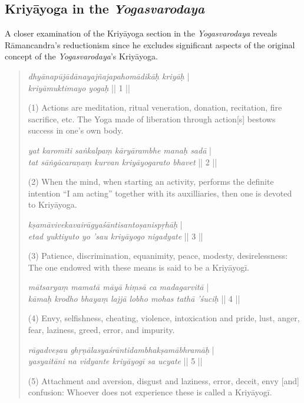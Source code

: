 \subsection{Kriyāyoga in the \textit{Yogasvarodaya}}
A closer examination of the Kriyāyoga section in the \textit{Yogasvarodaya} reveals Rāmancandra's reductionism since he excludes significant aspects of the original concept of the \textit{Yogasvarodaya}'s Kriyāyoga.


\begin{quote}
  \begin{ekdosis}
\textit{dhyānapūjādānayajñajapahomādikāḥ kriyāḥ} |\\
\textit{kriyāmuktimayo yogaḥ} || 1 ||

(1) Actions are meditation, ritual veneration, donation, recitation, fire sacrifice, etc. 
The Yoga made of liberation through action[s] bestows success in one's own body. 

\textit{yat karomīti saṅkalpaṃ kāryārambhe manaḥ sadā} |\\
\textit{tat sāṅgācaraṇaṃ kurvan kriyāyogarato bhavet} || 2 ||

(2) When the mind, when starting an activity, performs the definite intention ``I am acting''
together with its auxilliaries, then one is devoted to Kriyāyoga. 

\textit{kṣamāvivekavairāgyaśāntisantoṣanispṛhāḥ} |\\
\textit{etad yuktiyuto yo 'sau kriyāyogo nigadyate} || 3 ||

(3) Patience, discrimination, equanimity, peace, modesty, desirelessness:
The one endowed with these means is said to be a Kriyāyogī.

\textit{mātsaryaṃ mamatā māyā hiṃsā ca madagarvitā} |\\
\textit{kāmaḥ krodho bhayaṃ lajjā lobho mohas tathā 'śuciḥ} || 4 ||

(4) Envy, selfishness, cheating, violence, intoxication and pride,
lust, anger, fear, laziness, greed, error, and impurity.

\textit{rāgadveṣau ghṛṇālasyaśrāntidambhakṣamābhramāḥ} |\\
\textit{yasyaitāni na vidyante kriyāyogī sa ucyate} || 5 ||

(5) Attachment and aversion, disgust and laziness, error, deceit, envy [and] confusion:
Whoever does not experience these is called a Kriyāyogī.


\end{ekdosis}
\end{quote}

